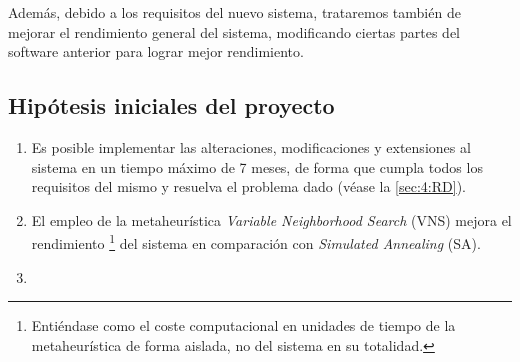Además, debido a los requisitos del nuevo sistema, trataremos también de mejorar el rendimiento general del sistema, modificando ciertas partes del software anterior para lograr mejor rendimiento.

\subsection{Hipótesis iniciales del proyecto}
\label{sec:Hipotesis}
\begin{enumerate}[label={H\arabic*}]
	\item \label{H1} Es posible implementar las alteraciones, modificaciones y extensiones al sistema en un tiempo máximo de 7 meses, de forma que cumpla todos los requisitos del mismo y resuelva el problema dado (véase la \autoref{sec:4:RD}).
	\item \label{H2} El empleo de la metaheurística \textit{Variable Neighborhood Search} (VNS) mejora el rendimiento%
	\footnote{Entiéndase como el coste computacional en unidades de tiempo  de la metaheurística de forma aislada, no del sistema en su totalidad.}
	del sistema en comparación con \textit{Simulated Annealing} (SA).
	\item \label{H3} 
\end{enumerate}

%
%
\glsaddall
\printglossary[title={Definiciones, acrónimos y abreviaturas}, nonumberlist]
%
%
%